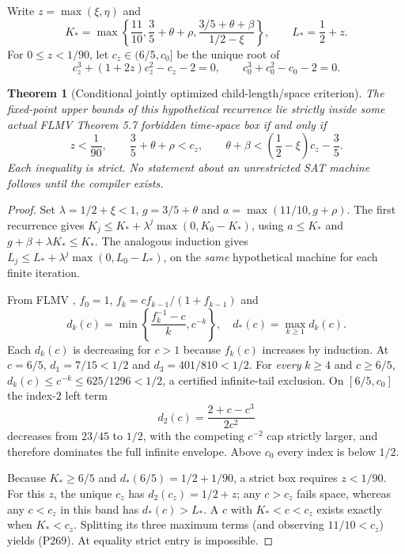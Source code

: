 \documentclass[11pt]{article}
\newtheorem{theorem}{Theorem}
\begin{document}
Write $z=\max(\xi,\eta)$ and
\[
K_*=\max\left\{\frac{11}{10},\frac35+\theta+\rho,
              \frac{3/5+\theta+\beta}{1/2-\xi}\right\},
\qquad L_*=\frac12+z.
\]
For $0\le z<1/90$, let $c_z\in(6/5,c_0]$ be the unique root of
\[
c_z^3+(1+2z)c_z^2-c_z-2=0,\qquad
c_0^3+c_0^2-c_0-2=0.
\]
\begin{theorem}[Conditional jointly optimized child-length/space criterion]
The fixed-point \emph{upper bounds} of this \emph{hypothetical} recurrence lie strictly inside \emph{some} actual FLMV Theorem 5.7 forbidden time-space box if and only if
\[
\boxed{\ z<\frac1{90},\qquad \frac35+\theta+\rho<c_z,\qquad
\theta+\beta<\left(\frac12-\xi\right)c_z-\frac35.\ }
\tag{P269}
\]
Each inequality is strict. No statement about an unrestricted SAT machine follows until the compiler exists.
\end{theorem}
\begin{proof}
Set $\lambda=1/2+\xi<1$, $g=3/5+\theta$ and $a=\max(11/10,g+\rho)$. The first recurrence gives
$K_j\le K_*+\lambda^j\max(0,K_0-K_*)$, using $a\le K_*$ and $g+\beta+\lambda K_*\le K_*$. The analogous induction gives $L_j\le L_*+\lambda^j\max(0,L_0-L_*)$, on the \emph{same} hypothetical machine for each finite iteration.

From FLMV \cite{flmv}, $f_0=1$, $f_k=cf_{k-1}/(1+f_{k-1})$ and
\[
d_k(c)=\min\left\{\frac{f_k^{-1}-c}{k},c^{-k}\right\},
\quad d_*(c)=\max_{k\ge1}d_k(c).
\]
Each $d_k(c)$ is decreasing for $c>1$ because $f_k(c)$ increases by induction. At $c=6/5$, $d_1=7/15<1/2$ and $d_3=401/810<1/2$. For \emph{every} $k\ge4$ and $c\ge6/5$, $d_k(c)\le c^{-k}\le625/1296<1/2$, a certified infinite-tail exclusion. On $[6/5,c_0]$ the index-$2$ left term
\[
d_2(c)=\frac{2+c-c^3}{2c^2}
\]
decreases from $23/45$ to $1/2$, with the competing $c^{-2}$ cap strictly larger, and therefore dominates the full infinite envelope. Above $c_0$ every index is below $1/2$.

Because $K_*\ge6/5$ and $d_*(6/5)=1/2+1/90$, a strict box requires $z<1/90$. For this $z$, the unique $c_z$ has $d_2(c_z)=1/2+z$; any $c>c_z$ fails space, whereas any $c<c_z$ in this band has $d_*(c)>L_*$. A $c$ with $K_*<c<c_z$ exists exactly when $K_*<c_z$. Splitting its three maximum terms (and observing $11/10<c_z$) yields (P269). At equality strict entry is impossible.
\end{proof}
\end{document}

